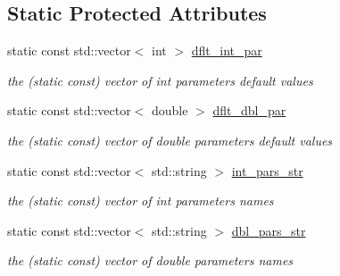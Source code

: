\subsection*{Static Protected Attributes}
\begin{DoxyCompactItemize}
\item 
\mbox{\label{class_s_m_spp__di__unipi__it_1_1_solver_a846fcd10214ecf366d3899b5b874e65e}} 
static const std\+::vector$<$ int $>$ \mbox{\hyperlink{class_s_m_spp__di__unipi__it_1_1_solver_a846fcd10214ecf366d3899b5b874e65e}{dflt\+\_\+int\+\_\+par}}
\begin{DoxyCompactList}\small\item\em the (static const) vector of int parameters default values \end{DoxyCompactList}\item 
\mbox{\label{class_s_m_spp__di__unipi__it_1_1_solver_a68fd2ce5c2e737f7a4e974ad754691db}} 
static const std\+::vector$<$ double $>$ \mbox{\hyperlink{class_s_m_spp__di__unipi__it_1_1_solver_a68fd2ce5c2e737f7a4e974ad754691db}{dflt\+\_\+dbl\+\_\+par}}
\begin{DoxyCompactList}\small\item\em the (static const) vector of double parameters default values \end{DoxyCompactList}\item 
\mbox{\label{class_s_m_spp__di__unipi__it_1_1_solver_acee4f305d906ae83ad3c0cbe09ff53e0}} 
static const std\+::vector$<$ std\+::string $>$ \mbox{\hyperlink{class_s_m_spp__di__unipi__it_1_1_solver_acee4f305d906ae83ad3c0cbe09ff53e0}{int\+\_\+pars\+\_\+str}}
\begin{DoxyCompactList}\small\item\em the (static const) vector of int parameters names \end{DoxyCompactList}\item 
\mbox{\label{class_s_m_spp__di__unipi__it_1_1_solver_a8506bf3c28cafd5180a996c9184f2f46}} 
static const std\+::vector$<$ std\+::string $>$ \mbox{\hyperlink{class_s_m_spp__di__unipi__it_1_1_solver_a8506bf3c28cafd5180a996c9184f2f46}{dbl\+\_\+pars\+\_\+str}}
\begin{DoxyCompactList}\small\item\em the (static const) vector of double parameters names \end{DoxyCompactList}\item 

\end{DoxyCompactItemize}
